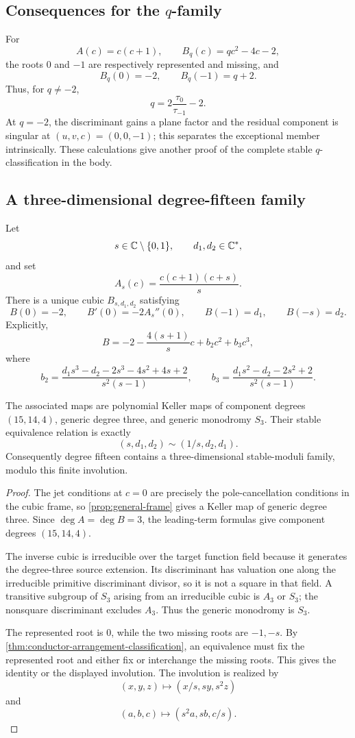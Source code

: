 \subsection{Consequences for the \texorpdfstring{\(q\)}{q}-family}

For
\[
A(c)=c(c+1),\qquad B_q(c)=qc^2-4c-2,
\]
the roots \(0\) and \(-1\) are respectively represented and missing, and
\[
B_q(0)=-2,\qquad B_q(-1)=q+2.
\]
Thus, for \(q\ne-2\),
\[
q=2\frac{\tau_0}{\tau_{-1}}-2.
\]
At \(q=-2\), the discriminant gains a plane factor and the residual
component is singular at \((u,v,c)=(0,0,-1)\); this separates the
exceptional member intrinsically.  These calculations give another proof
of the complete stable \(q\)-classification in the body.

\subsection{A three-dimensional degree-fifteen family}

Let
\[
s\in\mathbb C\setminus\{0,1\},\qquad d_1,d_2\in\mathbb C^*,
\]
and set
\[
A_s(c)=\frac{c(c+1)(c+s)}s.
\]
There is a unique cubic \(B_{s,d_1,d_2}\) satisfying
\[
B(0)=-2,\qquad B'(0)=-2A_s''(0),\qquad
B(-1)=d_1,\qquad B(-s)=d_2.
\]
Explicitly,
\[
B=-2-\frac{4(s+1)}s c+b_2c^2+b_3c^3,
\]
where
\[
b_2=
\frac{d_1s^3-d_2-2s^3-4s^2+4s+2}{s^2(s-1)},
\qquad
b_3=
\frac{d_1s^2-d_2-2s^2+2}{s^2(s-1)}.
\]

\begin{theorem}
\label{thm:degree-fifteen-moduli}
The associated maps are polynomial Keller maps of component degrees
\((15,14,4)\), generic degree three, and generic monodromy \(S_3\).
Their stable equivalence relation is exactly
\[
(s,d_1,d_2)\sim(1/s,d_2,d_1).
\]
Consequently degree fifteen contains a three-dimensional stable-moduli
family, modulo this finite involution.
\end{theorem}

\begin{proof}
The jet conditions at \(c=0\) are precisely the pole-cancellation
conditions in the cubic frame, so \cref{prop:general-frame} gives a Keller
map of generic degree three.  Since \(\deg A=\deg B=3\), the leading-term
formulas give component degrees \((15,14,4)\).

The inverse cubic is irreducible over the target function field because it
generates the degree-three source extension.  Its discriminant has valuation
one along the irreducible primitive discriminant divisor, so it is not a
square in that field.  A transitive subgroup of \(S_3\) arising from an
irreducible cubic is \(A_3\) or \(S_3\); the nonsquare discriminant excludes
\(A_3\).  Thus the generic monodromy is \(S_3\).

The represented root is \(0\), while the
two missing roots are \(-1,-s\).  By
\cref{thm:conductor-arrangement-classification}, an equivalence must fix the
represented root and either fix or interchange the missing roots.  This
gives the identity or the displayed involution.  The involution is realized
by
\[
(x,y,z)\longmapsto(x/s,sy,s^2z)
\]
and
\[
(a,b,c)\longmapsto(s^2a,sb,c/s).
\]
\end{proof}

